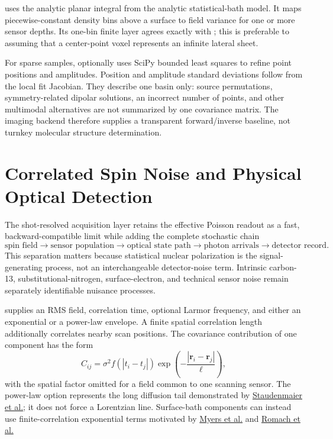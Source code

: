  uses the analytic planar integral from
the analytic statistical-bath model. It maps piecewise-constant density bins above a
surface to field variance for one or more sensor depths. Its one-bin finite
layer agrees exactly with ; this is preferable to
assuming that a center-point voxel represents an infinite lateral sheet.

For sparse samples,  optionally uses SciPy
bounded least squares to refine point positions and amplitudes. Position and
amplitude standard deviations follow from the local fit Jacobian. They
describe one basin only: source permutations, symmetry-related dipolar
solutions, an incorrect number of points, and other multimodal alternatives
are not summarized by one covariance matrix. The imaging backend therefore supplies a
transparent forward/inverse baseline, not turnkey molecular structure
determination.

\section{Correlated Spin Noise and Physical Optical Detection}

The shot-resolved acquisition layer retains the effective Poisson readout as a fast,
backward-compatible limit while adding the complete stochastic chain
\[
 \text{spin field}\longrightarrow
 \text{sensor population}\longrightarrow
 \text{optical state path}\longrightarrow
 \text{photon arrivals}\longrightarrow
 \text{detector record}.
\]
This separation matters because statistical nuclear polarization is the
signal-generating process, not an interchangeable detector-noise term.
Intrinsic carbon-13, substitutional-nitrogen, surface-electron, and technical
sensor noise remain separately identifiable nuisance processes.

 supplies an RMS field, correlation time, optional
Larmor frequency, and either an exponential or a power-law envelope. A finite
spatial correlation length additionally correlates nearby scan positions.
The covariance contribution of one component has the form
\[
 C_{ij}=\sigma^2 f(|t_i-t_j|)
 \exp\left(-\frac{|\mathbf r_i-\mathbf r_j|}{\ell}\right),
\]
with the spatial factor omitted for a field common to one scanning sensor.
The power-law option represents the long diffusion tail demonstrated by
\href{https://doi.org/10.1038/s41534-022-00632-1}
{Staudenmaier et al.}; it does not force a Lorentzian line. Surface-bath
components can instead use finite-correlation exponential terms motivated by
\href{https://doi.org/10.1103/PhysRevLett.113.027602}{Myers et al.} and
\href{https://doi.org/10.1103/PhysRevLett.114.017601}{Romach et al.}

